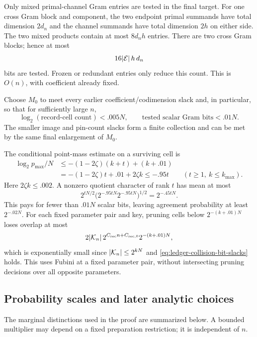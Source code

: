Only mixed primal-channel Gram entries are tested in the final target.
For one cross Gram block and component, the two endpoint primal
summands have total dimension \(2d_n\) and the channel summands have
total dimension \(2h\) on either side. The two mixed products
contain at most \(8d_nh\) entries.
There are two cross Gram blocks; hence at most
\begin{equation}
                              16|\mathcal E|\,h\,d_n
 \label{eq:ledger-tested-gram-bits}
\end{equation}
bits are tested. Frozen or redundant entries only reduce this count.
This is \(O(n)\), with coefficient already fixed.

Choose \(M_0\) to meet every earlier coefficient/codimension slack
and, in particular, so that for sufficiently large \(n\),
\begin{equation}
 \log_2(\text{record-cell count})<.005N,\qquad
 \text{tested scalar Gram bits}<.01N.
 \label{eq:ledger-collision-bit-slacks}
\end{equation}
The smaller image and pin-count slacks form a finite collection
and can be met by the same final enlargement of \(M_0\).

The conditional point-mass estimate on a surviving cell is
\[
 \begin{split}
 \log_2 p_{\max}/N
  &\le -(1-2\zeta)(k+t)+(k+.01)\\
  &=-(1-2\zeta)t+.01+2\zeta k
       \le-.95t
       \qquad(t\ge1,\ k\le k_{\max}).
 \end{split}
\]
Here \(2\zeta k\le.002\).
A nonzero quotient character of rank \(t\) has mean at most
\[
       2^{tN/2}
       \bigl(2^{-.95tN}2^{-.95tN}\bigr)^{1/2}
             =2^{-.45tN}.
\]
This pays for fewer than \(.01N\) scalar bits, leaving agreement
probability at least \(2^{-.02N}\).
For each fixed parameter pair and key, pruning cells below
\(2^{-(k+.01)N}\) loses overlap at most
\[
 2|\mathcal K_n|\,2^{C_{\mathrm{rec}}n+C_{\mathrm{rec},0}}
       2^{-(k+.01)N},
\]
which is exponentially small since \(|\mathcal K_n|\le2^{kN}\) and
\eqref{eq:ledger-collision-bit-slacks} holds.
This uses Fubini at a fixed parameter pair, without intersecting
pruning decisions over all opposite parameters.

\subsection{Probability scales and later analytic choices}
\label{sec:probability-scales}

The marginal distinctions used in the proof are summarized below.
A bounded multiplier may depend on a fixed preparation restriction;
it is independent of \(n\).

